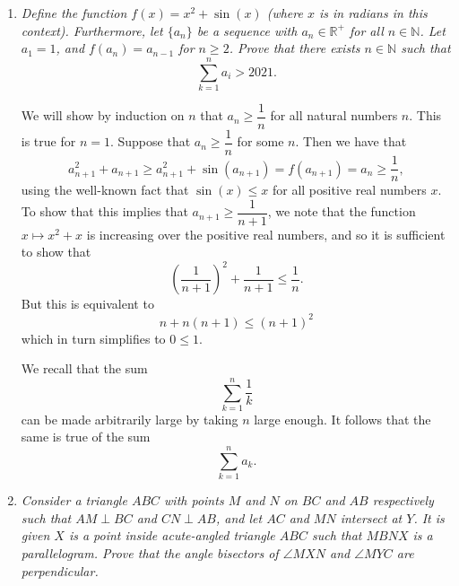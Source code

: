 \documentclass{article}
\begin{document}
\begin{enumerate}[1.]
\vspace{24pt}
\item %
{\itshape Define the function $f(x) = x^2 + \sin(x)$ (where $x$ is in radians in this context). Furthermore, let $\{a_n\}$ be a sequence with $a_n \in \mathbb{R}^+$ for all $n \in \mathbb{N}$. Let $a_1 = 1$, and $f(a_n) = a_{n - 1}$ for $n \ge 2$. Prove that there exists $n \in \mathbb{N}$ such that 
$$\sum_{k = 1}^n a_i > 2021.$$}

We will show by induction on $n$ that $a_n \geq \dfrac{1}{n}$ for all natural numbers $n$. This is true for $n = 1$. Suppose that $a_n \geq \dfrac{1}{n}$ for some $n$. Then we have that
\[
	a_{n + 1}^2 + a_{n + 1} \geq a_{n + 1}^2 + \sin(a_{n + 1}) = f(a_{n + 1}) = a_n \geq \dfrac{1}{n},
\]
using the well-known fact that $\sin(x) \leq x$ for all positive real numbers $x$. To show that this implies that $a_{n + 1} \geq \dfrac{1}{n + 1}$, we note that the function $x \mapsto x^2 + x$ is increasing over the positive real numbers, and so it is sufficient to show that
\[
	\left(\frac{1}{n + 1}\right)^2 + \frac{1}{n + 1} \leq \dfrac{1}{n}.
\]
But this is equivalent to
\[
	n + n(n + 1) \leq (n + 1)^2
\]
which in turn simplifies to $0 \leq 1$.

We recall that the sum
\[
	\sum_{k=1}^{n} \frac{1}{k}
\]
can be made arbitrarily large by taking $n$ large enough. It follows that the same is true of the sum
\[
	\sum_{k=1}^{n} a_k.	
\]


\vspace{24pt}
\item %
{\itshape Consider a triangle $ABC$ with points $M$ and $N$ on $BC$ and $AB$ respectively such that $AM \perp BC$ and $CN \perp AB$, and let $AC$ and $MN$ intersect at $Y$.
It is given $X$ is a point inside acute-angled triangle $ABC$ such that $MBNX$ is a parallelogram.
Prove that the angle bisectors of $\angle MXN$ and $\angle MYC$ are perpendicular.}


\end{enumerate}
\end{document}
